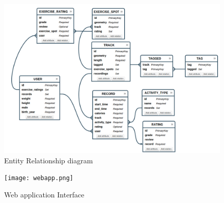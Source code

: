 \documentclass[11pt,a4paper]{scrreprt}
\begin{document}
\begin{figure}[h]
    \includegraphics[width=\textwidth]{er-diagram.png}
    \caption{Entity Relationship diagram}
    \label{db:er}
\end{figure}

\begin{figure}[h]
    \texttt{[image: webapp.png]}
    \caption{Web application Interface}
    \label{app:scshot}
\end{figure}
\end{document}
